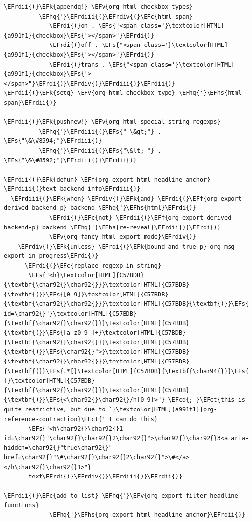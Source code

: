 \documentclass{scrartcl}
\newcommand{\EFk}[1]{\textcolor{EFk}{#1}} %
\newcommand{\EFs}[1]{\textcolor{EFs}{#1}} %
\newcommand{\EFct}[1]{\textcolor{EFct}{#1}} %
\newcommand{\EFc}[1]{\textcolor{EFc}{#1}} %
\newcommand{\EFv}[1]{\textcolor{EFv}{#1}} %
\newcommand{\EFf}[1]{\textcolor{EFf}{#1}} %
\newcommand{\EFcd}[1]{\textcolor{EFcd}{#1}} %
\newcommand{\EFhq}[1]{#1} %
\newcommand{\EFhs}[1]{#1} %
\newcommand{\EFrdi}[1]{#1} %
\newcommand{\EFrdii}[1]{#1} %
\newcommand{\EFrdiii}[1]{#1} %
\newcommand{\EFrdiv}[1]{#1} %
\begin{document}
\begin{Code}
\begin{Verbatim}[]
\EFrdii{(}\EFk{appendq!} \EFv{org-html-checkbox-types}
          \EFhq{'}\EFrdiii{(}\EFrdiv{(}\EFc{html-span}
             \EFrdi{(}on . \EFs{"<span class='}\textcolor[HTML]{a991f1}{checkbox}\EFs{'></span>"}\EFrdi{)}
             \EFrdi{(}off . \EFs{"<span class='}\textcolor[HTML]{a991f1}{checkbox}\EFs{'></span>"}\EFrdi{)}
             \EFrdi{(}trans . \EFs{"<span class='}\textcolor[HTML]{a991f1}{checkbox}\EFs{'></span>"}\EFrdi{)}\EFrdiv{)}\EFrdiii{)}\EFrdii{)}
\EFrdii{(}\EFk{setq} \EFv{org-html-checkbox-type} \EFhq{'}\EFhs{html-span}\EFrdii{)}

\EFrdii{(}\EFk{pushnew!} \EFv{org-html-special-string-regexps}
          \EFhq{'}\EFrdiii{(}\EFs{"-\&gt;"} . \EFs{"\&\#8594;"}\EFrdiii{)}
          \EFhq{'}\EFrdiii{(}\EFs{"\&lt;-"} . \EFs{"\&\#8592;"}\EFrdiii{)}\EFrdii{)}

\EFrdii{(}\EFk{defun} \EFf{org-export-html-headline-anchor} \EFrdiii{(}text backend info\EFrdiii{)}
  \EFrdiii{(}\EFk{when} \EFrdiv{(}\EFk{and} \EFrdi{(}\EFf{org-export-derived-backend-p} backend \EFhq{'}\EFhs{html}\EFrdi{)}
             \EFrdi{(}\EFc{not} \EFrdii{(}\EFf{org-export-derived-backend-p} backend \EFhq{'}\EFhs{re-reveal}\EFrdii{)}\EFrdi{)}
             \EFv{org-fancy-html-export-mode}\EFrdiv{)}
    \EFrdiv{(}\EFk{unless} \EFrdi{(}\EFk{bound-and-true-p} org-msg-export-in-progress\EFrdi{)}
      \EFrdi{(}\EFc{replace-regexp-in-string}
       \EFs{"<h}\textcolor[HTML]{C57BDB}{\textbf{\char92{}\char92{}}}\textcolor[HTML]{C57BDB}{\textbf{(}}\EFs{[0-9]}\textcolor[HTML]{C57BDB}{\textbf{\char92{}\char92{}}}\textcolor[HTML]{C57BDB}{\textbf{)}}\EFs{ id=\char92{}"}\textcolor[HTML]{C57BDB}{\textbf{\char92{}\char92{}}}\textcolor[HTML]{C57BDB}{\textbf{(}}\EFs{[a-z0-9-]+}\textcolor[HTML]{C57BDB}{\textbf{\char92{}\char92{}}}\textcolor[HTML]{C57BDB}{\textbf{)}}\EFs{\char92{}">}\textcolor[HTML]{C57BDB}{\textbf{\char92{}\char92{}}}\textcolor[HTML]{C57BDB}{\textbf{(}}\EFs{.*[}\textcolor[HTML]{C57BDB}{\textbf{\char94{}}}\EFs{ ]}\textcolor[HTML]{C57BDB}{\textbf{\char92{}\char92{}}}\textcolor[HTML]{C57BDB}{\textbf{)}}\EFs{<\char92{}\char92{}/h[0-9]>"} \EFcd{; }\EFct{this is quite restrictive, but due to `}\textcolor[HTML]{a991f1}{org-reference-contraction}\EFct{' I can do this}
       \EFs{"<h\char92{}\char92{}1 id=\char92{}"\char92{}\char92{}2\char92{}">\char92{}\char92{}3<a aria-hidden=\char92{}"true\char92{}" href=\char92{}"\#\char92{}\char92{}2\char92{}">\#</a> </h\char92{}\char92{}1>"}
       text\EFrdi{)}\EFrdiv{)}\EFrdiii{)}\EFrdii{)}

\EFrdii{(}\EFc{add-to-list} \EFhq{'}\EFv{org-export-filter-headline-functions}
             \EFhq{'}\EFhs{org-export-html-headline-anchor}\EFrdii{)}


\end{Verbatim}
\end{Code}
\end{document}
